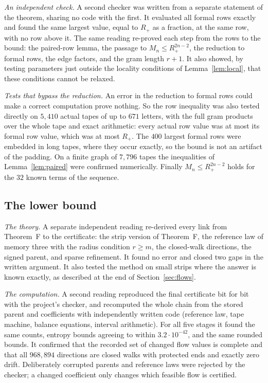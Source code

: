 \emph{An independent check.} A second checker was written from a separate statement of the theorem, sharing no code
with the first. It evaluated all formal rows exactly and found the same largest value, equal to $R_+$ as a fraction,
at the same row, with no row above it. The same reading re-proved each step from the rows to the bound: the
paired-row lemma, the passage to $M_n\le R_+^{2n-2}$, the reduction to formal rows, the edge factors, and the gram
length $r+1$. It also showed, by testing parameters just outside the locality conditions of Lemma~\ref{lem:local},
that these conditions cannot be relaxed.

\emph{Tests that bypass the reduction.} An error in the reduction to formal rows could make a correct computation
prove nothing. So the row inequality was also tested directly on $5{,}410$ actual tapes of up to $671$ letters, with the full gram
products over the whole tape and exact arithmetic: every actual row value was at most its formal row value, which was
at most $R_+$. The $400$ largest formal rows were embedded in long tapes, where they occur exactly, so the bound is not
an artifact of the padding. On a finite graph of $7{,}796$ tapes the inequalities of Lemma~\ref{lem:paired} were
confirmed numerically. Finally $M_n\le R_+^{2n-2}$ holds for the $32$ known terms of the sequence.

\subsection{The lower bound}

\emph{The theory.} A separate independent reading re-derived every link from Theorem~F to the certificate: the strip
version of Theorem~F, the reference law of memory three with the radius condition $r\ge m$, the closed-walk
directions, the signed parent, and sparse refinement. It found no error and closed two gaps in the written argument.
It also
tested the method on small strips where the answer is known exactly, as described at the end of
Section~\ref{sec:flows}.

\emph{The computation.} A second reading reproduced the final certificate bit for bit with the project's checker,
and recomputed the whole chain from the stored parent and coefficients with independently written code (reference law,
tape machine, balance equations, interval arithmetic). For all five stages it found the same counts, entropy bounds
agreeing to within $3.2\cdot10^{-42}$, and the same rounded bounds. It confirmed that the recorded set of changed
flow values is complete and that all $968{,}894$ directions are closed walks with protected ends and exactly zero drift.
Deliberately corrupted parents and reference laws were rejected by the checker; a changed coefficient only changes
which feasible flow is certified.

